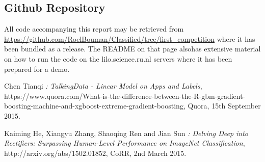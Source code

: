 \documentclass[runningheads,a4paper]{llncs}
\begin{document}
\subsection{Github Repository}
All code accompanying this report may be retrieved from \url{https://github.com/RoelBouman/Classified/tree/first_competition} where it has been bundled as a release. The README on that page alsohas extensive material on how to run the code on the lilo.science.ru.nl servers where it has been prepared for a demo. 

{}

\begin{thebibliography}{9}

Chen Tianqi
\emph{: TalkingData - Linear Model on Apps and Labels},
https://www.quora.com/What-is-the-difference-between-the-R-gbm-gradient-boosting-machine-and-xgboost-extreme-gradient-boosting,
Quora,
15th September 2015.

Kaiming He, Xiangyu Zhang, Shaoqing Ren and Jian Sun
\emph{: Delving Deep into Rectifiers: Surpassing Human-Level Performance on ImageNet Classification},
http://arxiv.org/abs/1502.01852,
CoRR,
2nd March 2015.  

\end{thebibliography}
\end{document}
